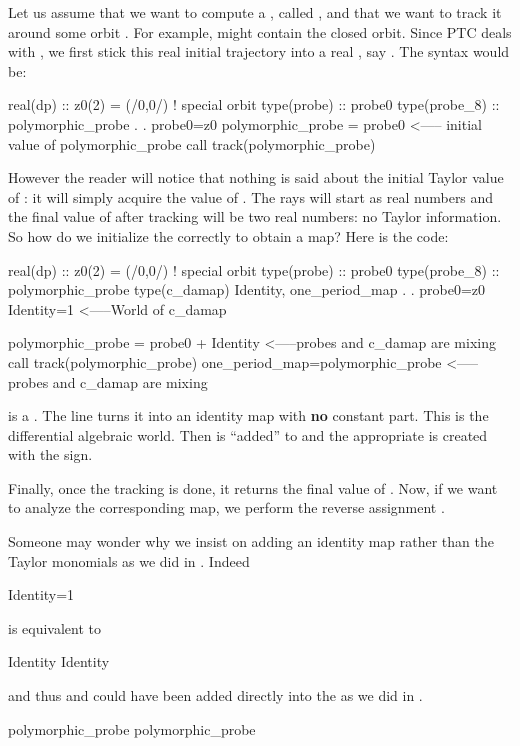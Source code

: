 \documentclass[english,12pt,article]{article} %
\begin{document}
{{  Let us assume that we want to compute a , called  , and that we want to track it around some orbit . For example,  might contain the closed orbit. Since PTC deals with , we first stick this real initial trajectory into a real , say . The syntax would be:
  
    \begin{code}
     real(dp) :: z0(2) = (/0,0/)  ! special orbit
     type(probe) :: probe0 
     type(probe_8) :: polymorphic_probe  
                  .
                  .
      probe0=z0
      polymorphic_probe = probe0    <----- initial value of polymorphic_probe
      call track(polymorphic_probe)
     \end{code}
  
  However the reader will notice that nothing is said about the initial Taylor value of  : it will simply acquire the value of . The rays will start as real numbers and the final value of    after tracking will be two real numbers: no Taylor information. So how do we initialize the  correctly to obtain a map? Here is the code:
  
      \begin{code}
real(dp) :: z0(2) = (/0,0/)  ! special orbit
type(probe) :: probe0 
type(probe_8) :: polymorphic_probe  
type(c_damap) Identity, one_period_map
             .
             .
 probe0=z0
 Identity=1     <-----World of c_damap

 polymorphic_probe = probe0 + Identity   <-----probes and c_damap are mixing
 call track(polymorphic_probe)
 one_period_map=polymorphic_probe       <-----probes and c_damap are mixing
     \end{code}
  
 is a . The line  turns it into an identity map with {\bf no} constant part. This is the differential algebraic world. 
Then   is ``added'' to  and the appropriate   is  created with the \vn{=} sign. 
  
  Finally, once the tracking is done, it returns the final value of . Now, if we want to analyze the corresponding map, we perform the reverse assignment 
  .  
  
  Someone may wonder why we insist on adding an identity map rather than the Taylor monomials as we did in   . Indeed 
   \begin{example}
   Identity=1
    \end{example}
    is equivalent to 
      \begin{example}
       Identity%
       Identity%
    \end{example}   
    and thus    and  could have been added directly into the  as we did in   .
          \begin{example}
       polymorphic_probe%
       polymorphic_probe%
    \end{example}


}}
\end{document}
